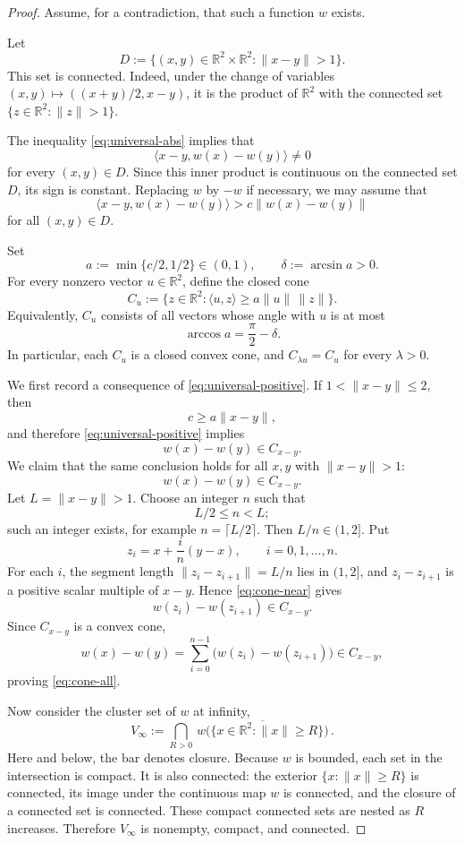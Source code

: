 \documentclass[11pt]{article}
\theoremstyle{remark}
\begin{document}
\begin{proof}
Assume, for a contradiction, that such a function $w$ exists.

Let
\[
D:=\{(x,y)\in\mathbb R^2\times\mathbb R^2:\|x-y\|>1\}.
\]
This set is connected. Indeed, under the change of variables $(x,y)\mapsto ((x+y)/2,x-y)$, it is the product of $\mathbb R^2$ with the connected set $\{z\in\mathbb R^2:\|z\|>1\}$.

The inequality \eqref{eq:universal-abs} implies that
\[
\langle x-y,w(x)-w(y)\rangle\ne 0
\]
for every $(x,y)\in D$. Since this inner product is continuous on the connected set $D$, its sign is constant. Replacing $w$ by $-w$ if necessary, we may assume that
\begin{equation}\label{eq:universal-positive}
\langle x-y,w(x)-w(y)\rangle>c\|w(x)-w(y)\|
\end{equation}
for all $(x,y)\in D$.

Set
\[
a:=\min\{c/2,1/2\}\in(0,1),
\qquad
\delta:=\arcsin a>0.
\]
For every nonzero vector $u\in\mathbb R^2$, define the closed cone
\[
C_u:=\{z\in\mathbb R^2:\langle u,z\rangle\ge a\|u\|\,\|z\|\}.
\]
Equivalently, $C_u$ consists of all vectors whose angle with $u$ is at most
\[
\arccos a=\frac{\pi}{2}-\delta .
\]
In particular, each $C_u$ is a closed convex cone, and $C_{\lambda u}=C_u$ for every $\lambda>0$.

We first record a consequence of \eqref{eq:universal-positive}. If $1<\|x-y\|\le 2$, then
\[
c\ge a\|x-y\|,
\]
and therefore \eqref{eq:universal-positive} implies
\begin{equation}\label{eq:cone-near}
w(x)-w(y)\in C_{x-y}.
\end{equation}
We claim that the same conclusion holds for all $x,y$ with $\|x-y\|>1$:
\begin{equation}\label{eq:cone-all}
w(x)-w(y)\in C_{x-y}.
\end{equation}
Let $L=\|x-y\|>1$. Choose an integer $n$ such that
\[
L/2\le n<L;
\]
such an integer exists, for example $n=\lceil L/2\rceil$. Then $L/n\in(1,2]$. Put
\[
z_i=x+\frac{i}{n}(y-x), \qquad i=0,1,\ldots,n.
\]
For each $i$, the segment length $\|z_i-z_{i+1}\|=L/n$ lies in $(1,2]$, and $z_i-z_{i+1}$ is a positive scalar multiple of $x-y$. Hence \eqref{eq:cone-near} gives
\[
w(z_i)-w(z_{i+1})\in C_{x-y}.
\]
Since $C_{x-y}$ is a convex cone,
\[
w(x)-w(y)=\sum_{i=0}^{n-1}\bigl(w(z_i)-w(z_{i+1})\bigr)
\in C_{x-y},
\]
proving \eqref{eq:cone-all}.

Now consider the cluster set of $w$ at infinity,
\[
V_\infty:=\bigcap_{R>0}
\overline{\,w\bigl(\{x\in\mathbb R^2:\|x\|\ge R\}\bigr)\,}.
\]
Here and below, the bar denotes closure. Because $w$ is bounded, each set in the intersection is compact. It is also connected: the exterior $\{x:\|x\|\ge R\}$ is connected, its image under the continuous map $w$ is connected, and the closure of a connected set is connected. These compact connected sets are nested as $R$ increases. Therefore $V_\infty$ is nonempty, compact, and connected.


\end{proof}
\end{document}
